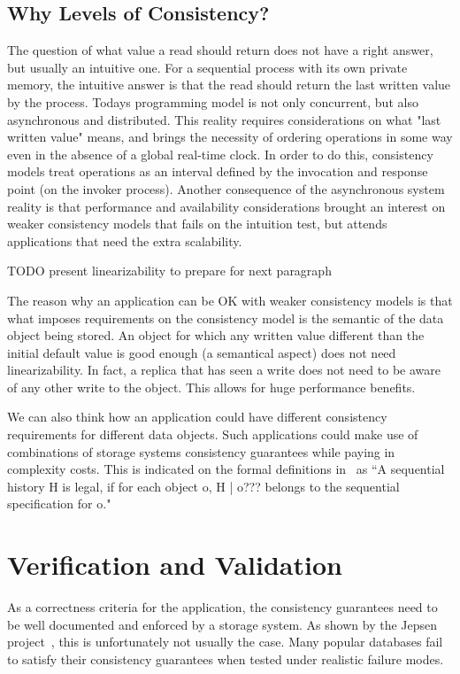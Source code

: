 \documentclass[12pt,conference]{IEEEtran}
\begin{document}
\subsection{Why Levels of Consistency?}

The question of what value a read should return does not have a right answer, but usually an intuitive one. For a sequential process with its own private memory, the intuitive answer is that the read should return the last written value by the process. Todays programming model is not only concurrent, but also asynchronous and distributed. This reality requires considerations on what "last written value" means, and brings the necessity of ordering operations in some way even in the absence of a global real-time clock. In order to do this, consistency models treat operations as an interval defined by the invocation and response point (on the invoker process). Another consequence of the asynchronous system reality is that performance and availability considerations brought an interest on weaker consistency models that fails on the intuition test, but attends applications that need the extra scalability.

TODO present linearizability to prepare for next paragraph

The reason why an application can be OK with weaker consistency models is that what imposes requirements on the consistency model is the semantic of the data object being stored. An object for which any written value different than the initial default value is good enough (a semantical aspect) does not need linearizability. In fact, a replica that has seen a write does not need to be aware of any other write to the object. This allows for huge performance benefits. 

We can also think how an application could have different consistency requirements for different data objects. Such applications could make use of combinations of storage systems consistency guarantees while paying in complexity costs. This is indicated on the formal definitions in~\cite{dziuma2013survey} as “A sequential history H is legal, if for each object o, H | o??? belongs to the sequential specification for o."

\section{Verification and Validation}

As a correctness criteria for the application, the consistency guarantees need to be well documented and enforced by a storage system. As shown by the Jepsen project~\cite{jepsenWebsite,jepsenGithubWebsite}, this is unfortunately not usually the case. Many popular databases fail to satisfy their consistency guarantees when tested under realistic failure modes.
\end{document}
